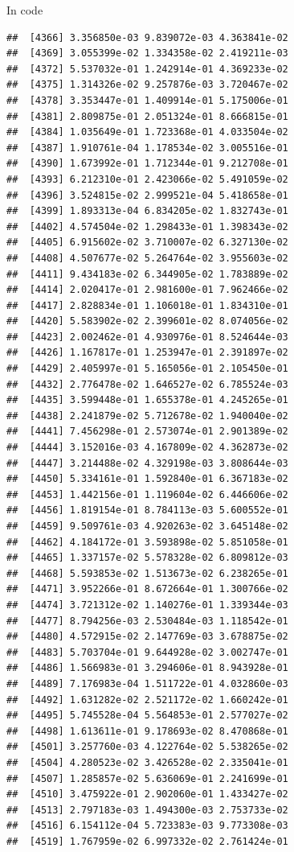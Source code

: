 \documentclass[ignorenonframetext,]{beamer}
\begin{document}
\begin{frame}[fragile]{In code}
\begin{verbatim}
##  [4366] 3.356850e-03 9.839072e-03 4.363841e-02
##  [4369] 3.055399e-02 1.334358e-02 2.419211e-03
##  [4372] 5.537032e-01 1.242914e-01 4.369233e-02
##  [4375] 1.314326e-02 9.257876e-03 3.720467e-02
##  [4378] 3.353447e-01 1.409914e-01 5.175006e-01
##  [4381] 2.809875e-01 2.051324e-01 8.666815e-01
##  [4384] 1.035649e-01 1.723368e-01 4.033504e-02
##  [4387] 1.910761e-04 1.178534e-02 3.005516e-01
##  [4390] 1.673992e-01 1.712344e-01 9.212708e-01
##  [4393] 6.212310e-01 2.423066e-02 5.491059e-02
##  [4396] 3.524815e-02 2.999521e-04 5.418658e-01
##  [4399] 1.893313e-04 6.834205e-02 1.832743e-01
##  [4402] 4.574504e-02 1.298433e-01 1.398343e-02
##  [4405] 6.915602e-02 3.710007e-02 6.327130e-02
##  [4408] 4.507677e-02 5.264764e-02 3.955603e-02
##  [4411] 9.434183e-02 6.344905e-02 1.783889e-02
##  [4414] 2.020417e-01 2.981600e-01 7.962466e-02
##  [4417] 2.828834e-01 1.106018e-01 1.834310e-01
##  [4420] 5.583902e-02 2.399601e-02 8.074056e-02
##  [4423] 2.002462e-01 4.930976e-01 8.524644e-03
##  [4426] 1.167817e-01 1.253947e-01 2.391897e-02
##  [4429] 2.405997e-01 5.165056e-01 2.105450e-01
##  [4432] 2.776478e-02 1.646527e-02 6.785524e-03
##  [4435] 3.599448e-01 1.655378e-01 4.245265e-01
##  [4438] 2.241879e-02 5.712678e-02 1.940040e-02
##  [4441] 7.456298e-01 2.573074e-01 2.901389e-02
##  [4444] 3.152016e-03 4.167809e-02 4.362873e-02
##  [4447] 3.214488e-02 4.329198e-03 3.808644e-03
##  [4450] 5.334161e-01 1.592840e-01 6.367183e-02
##  [4453] 1.442156e-01 1.119604e-02 6.446606e-02
##  [4456] 1.819154e-01 8.784113e-03 5.600552e-01
##  [4459] 9.509761e-03 4.920263e-02 3.645148e-02
##  [4462] 4.184172e-01 3.593898e-02 5.851058e-01
##  [4465] 1.337157e-02 5.578328e-02 6.809812e-03
##  [4468] 5.593853e-02 1.513673e-02 6.238265e-01
##  [4471] 3.952266e-01 8.672664e-01 1.300766e-02
##  [4474] 3.721312e-02 1.140276e-01 1.339344e-03
##  [4477] 8.794256e-03 2.530484e-03 1.118542e-01
##  [4480] 4.572915e-02 2.147769e-03 3.678875e-02
##  [4483] 5.703704e-01 9.644928e-02 3.002747e-01
##  [4486] 1.566983e-01 3.294606e-01 8.943928e-01
##  [4489] 7.176983e-04 1.511722e-01 4.032860e-03
##  [4492] 1.631282e-02 2.521172e-02 1.660242e-01
##  [4495] 5.745528e-04 5.564853e-01 2.577027e-02
##  [4498] 1.613611e-01 9.178693e-02 8.470868e-01
##  [4501] 3.257760e-03 4.122764e-02 5.538265e-02
##  [4504] 4.280523e-02 3.426528e-02 2.335041e-01
##  [4507] 1.285857e-02 5.636069e-01 2.241699e-01
##  [4510] 3.475922e-01 2.902060e-01 1.433427e-02
##  [4513] 2.797183e-03 1.494300e-03 2.753733e-02
##  [4516] 6.154112e-04 5.723383e-03 9.773308e-03
##  [4519] 1.767959e-02 6.997332e-02 2.761424e-01

\end{verbatim}
\end{frame}
\end{document}
